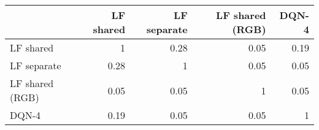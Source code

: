 \begin{tabular}{lrrrr}
\hline
                 &   LF shared &   LF separate &   LF shared (RGB) &   DQN-4 \\
\hline
 LF shared       &        1    &          0.28 &              0.05 &    0.19 \\
 LF separate     &        0.28 &          1    &              0.05 &    0.05 \\
 LF shared (RGB) &        0.05 &          0.05 &              1    &    0.05 \\
 DQN-4           &        0.19 &          0.05 &              0.05 &    1    \\
\hline
\end{tabular}